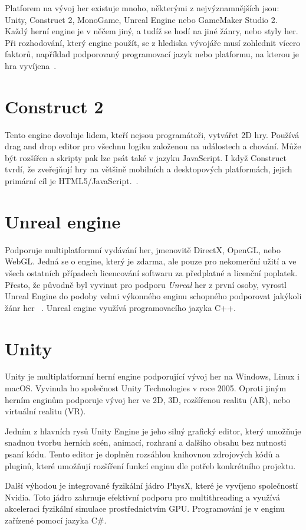 Platforem na vývoj her existuje mnoho, některými z nejvýznamnějších jsou: Unity, Construct 2, MonoGame, Unreal Engine nebo GameMaker Studio 2. Každý herní engine je v něčem jiný, a tudíž se hodí na jiné žánry, nebo styly her. Při rozhodování, který engine použít, se z hlediska vývojáře musí zohlednit vícero faktorů, například podporovaný programovací jazyk nebo platformu, na kterou je hra vyvíjena~\cite{vohera2021game}.

\section{Construct 2}
Tento engine dovoluje lidem, kteří nejsou programátoři, vytvářet 2D hry. Používá drag and drop editor pro všechnu logiku založenou na událostech a chování. Může být rozšířen a skripty pak lze psát také v jazyku JavaScript. I když Construct tvrdí, že zveřejňují hry na většině mobilních a desktopových platformách, jejich primární cíl je HTML5/JavaScript.~\cite{engines}.

\section{Unreal engine}
Podporuje multiplatformní vydávání her, jmenovitě DirectX, OpenGL, nebo WebGL. Jedná se o engine, který je zdarma, ale pouze pro nekomerční užití a ve všech ostatních případech licencování softwaru za předplatné a licenční poplatek. Přesto, že původně byl vyvinut pro podporu \textit{Unreal} her z první osoby, vyrostl Unreal Engine do podoby velmi výkonného enginu schopného podporovat jakýkoli žánr her ~\cite{engines}. Unreal engine využívá programovacího jazyka C++.

\section{Unity}
\label{unity}
Unity je multiplatformní herní engine podporující vývoj her na Windows, Linux i macOS.
Vyvinula ho společnost Unity Technologies v roce 2005. Oproti jiným herním enginům podporuje vývoj her ve 2D, 3D, rozšířenou realitu (AR), nebo virtuální realitu (VR). 

Jedním z hlavních rysů Unity Engine je jeho silný grafický editor, který umožňuje snadnou tvorbu herních scén, animací, rozhraní a dalšího obsahu bez nutnosti psaní kódu. Tento editor je doplněn rozsáhlou knihovnou zdrojových kódů a pluginů, které umožňují rozšíření funkcí enginu dle potřeb konkrétního projektu.

Další výhodou je integrované fyzikální jádro PhysX, které je vyvíjeno společností Nvidia. Toto jádro zahrnuje efektivní podporu pro multithreading a využívá akceleraci fyzikální simulace prostřednictvím GPU. Programování je v enginu zařízené pomocí jazyka C\#.

